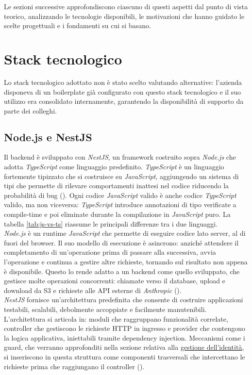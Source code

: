 Le sezioni successive approfondiscono ciascuno di questi aspetti dal punto di vista teorico, analizzando le tecnologie disponibili, le motivazioni che hanno guidato le scelte progettuali e i fondamenti su cui si basano.

\section{Stack tecnologico}
Lo stack tecnologico adottato non è stato scelto valutando alternative: l'azienda disponeva di un boilerplate già configurato con questo stack tecnologico e il suo utilizzo era consolidato internamente, garantendo la disponibilità di supporto da parte dei colleghi.

\subsection{Node.js e NestJS}
Il backend è sviluppato con \emph{NestJS}, un framework costruito sopra \emph{Node.js} che adotta \emph{TypeScript} come linguaggio predefinito. \emph{TypeScript} è un linguaggio fortemente tipizzato che si costruisce su \emph{JavaScript}, aggiungendo un sistema di tipi che permette di rilevare comportamenti inattesi nel codice riducendo la probabilità di bug (\cite{site:typescript}). Ogni codice \emph{JavaScript} valido è anche codice \emph{TypeScript} valido, ma non viceversa: \emph{TypeScript} introduce annotazioni di tipo verificate a compile-time e poi eliminate durante la compilazione in \emph{JavaScript} puro. La tabella \ref{tab:js-vs-ts} riassume le principali differenze tra i due linguaggi.\\

\emph{Node.js} è un runtime \emph{JavaScript} che permette di eseguire codice lato server, al di fuori del browser. Il suo modello di esecuzione è asincrono: anziché attendere il completamento di un'operazione prima di passare alla successiva, avvia l'operazione e continua a gestire altre richieste, tornando sul risultato non appena è disponibile. Questo lo rende adatto a un backend come quello sviluppato, che gestisce molte operazioni concorrenti: chiamate verso il database, upload e download da S3 e richieste alle API esterne di \emph{Anthropic} (\cite{site:nodejs}).\\

\emph{NestJS} fornisce un'architettura predefinita che consente di costruire applicazioni testabili, scalabili, debolmente accoppiate e facilmente manutenibili. L'architettura si articola in: moduli che raggruppano funzionalità correlate, controller che gestiscono le richieste HTTP in ingresso e provider che contengono la logica applicativa, iniettabili tramite dependency injection. Meccanismi come i guard, che verranno approfonditi nella sezione relativa alla \hyperref[section:gestione_identita]{gestione dell'identità}, si inseriscono in questa struttura come componenti trasversali che intercettano le richieste prima che raggiungano il controller (\cite{site:nestjs}).


